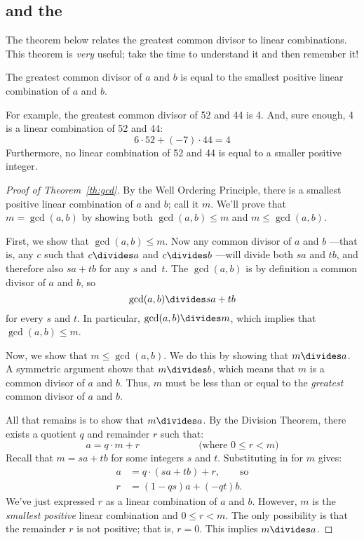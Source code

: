 \iffalse
\begin{editingnotes}
\subsection{ and the }

The theorem below relates the greatest common divisor to linear
combinations.  This theorem is \emph{very} useful; take the time to
understand it and then remember it!

\begin{theorem} \label{th:gcd} The greatest common divisor of $a$ and $b$ is equal to
the smallest positive linear combination of $a$ and $b$.
\end{theorem}

For example, the greatest common divisor of 52 and 44 is 4.  And, sure
enough, 4 is a linear combination of 52 and 44:
\[
6 \cdot 52 + (-7) \cdot 44 = 4
\]
Furthermore, no linear combination of 52 and 44 is equal to a smaller
positive integer.

\begin{proof}[Proof of Theorem~\ref{th:gcd}]
By the Well Ordering Principle, there is a smallest positive linear
combination of $a$ and $b$; call it $m$.  We'll prove that $m =
\gcd(a, b)$ by showing both $\gcd(a, b) \leq m$ and $m \leq \gcd(a,
b)$.

First, we show that $\gcd(a, b) \leq m$.  Now any common divisor of
$a$ and $b$ ---that is, any $c$ such that $c \divides a$ and $c
\divides b$ ---will divide both $sa$ and $tb$, and therefore also
$sa+tb$ for any $s$ and~$t$.  The $\gcd(a, b)$ is by definition a
common divisor of $a$ and $b$, so
\begin{equation}\label{gcdabdivlin} \gcd(a, b)
\divides s a + t b
\end{equation}
for every $s$ and $t$.  In particular, $\gcd(a, b) \divides m$, which
implies that $\gcd(a, b) \leq m$.

Now, we show that $m \leq \gcd(a, b)$.  We do this by showing that $m
\divides a$.  A symmetric argument shows that $m \divides b$, which
means that $m$ is a common divisor of $a$ and $b$.  Thus, $m$ must be
less than or equal to the \emph{greatest} common divisor of $a$ and
$b$.

All that remains is to show that $m \divides a$.  By the Division
Theorem, there exists a quotient $q$ and remainder $r$ such that:
\[
a = q \cdot m + r \hspace{1in} \text{(where $0 \leq r < m$)} \] Recall
that $m = s a + t b$ for some integers $s$ and $t$.  Substituting in
for $m$ gives:
\begin{align*} a & = q \cdot (s a + t b) + r,
\qquad \text{so} \\
r & = (1 - qs) a + (-qt) b.
\end{align*}
We've just expressed $r$ as a linear combination of $a$ and $b$.
However, $m$ is the \emph{smallest positive} linear combination and $0
\leq r < m$.  The only possibility is that the remainder $r$ is not
positive; that is, $r = 0$.  This implies $m \divides a$.  \end{proof}


\end{editingnotes}
